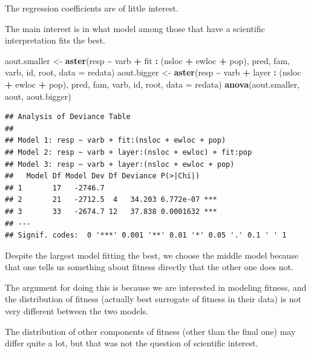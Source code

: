 \documentclass[
  ignorenonframetext,
]{beamer}
\newenvironment{Shaded}{\begin{snugshade}}{\end{snugshade}}
\newcommand{\AttributeTok}[1]{\textcolor[rgb]{0.13,0.29,0.53}{#1}}
\newcommand{\FunctionTok}[1]{\textcolor[rgb]{0.13,0.29,0.53}{\textbf{#1}}}
\newcommand{\NormalTok}[1]{#1}
\newcommand{\OtherTok}[1]{\textcolor[rgb]{0.56,0.35,0.01}{#1}}
\newcommand{\SpecialCharTok}[1]{\textcolor[rgb]{0.81,0.36,0.00}{\textbf{#1}}}
\begin{document}
\begin{frame}[fragile]{}
\protect\hypertarget{section-20}{}
The regression coefficients are of little interest.

The main interest is in what model among those that have a scientific
interpretation fits the best.

\vspace{12pt}
\tiny

\begin{Shaded}
\begin{Highlighting}[]
\NormalTok{aout.smaller }\OtherTok{\textless{}{-}} \FunctionTok{aster}\NormalTok{(resp }\SpecialCharTok{\textasciitilde{}}\NormalTok{ varb }\SpecialCharTok{+} 
\NormalTok{  fit }\SpecialCharTok{:}\NormalTok{ (nsloc }\SpecialCharTok{+}\NormalTok{ ewloc }\SpecialCharTok{+}\NormalTok{ pop), }
\NormalTok{  pred, fam, varb, id, root, }\AttributeTok{data =}\NormalTok{ redata)}
\NormalTok{aout.bigger }\OtherTok{\textless{}{-}} \FunctionTok{aster}\NormalTok{(resp }\SpecialCharTok{\textasciitilde{}}\NormalTok{ varb }\SpecialCharTok{+} 
\NormalTok{  layer }\SpecialCharTok{:}\NormalTok{ (nsloc }\SpecialCharTok{+}\NormalTok{ ewloc }\SpecialCharTok{+}\NormalTok{ pop), }
\NormalTok{  pred, fam, varb, id, root, }\AttributeTok{data =}\NormalTok{ redata)}
\FunctionTok{anova}\NormalTok{(aout.smaller, aout, aout.bigger)}
\end{Highlighting}
\end{Shaded}

\begin{verbatim}
## Analysis of Deviance Table
## 
## Model 1: resp ~ varb + fit:(nsloc + ewloc + pop)
## Model 2: resp ~ varb + layer:(nsloc + ewloc) + fit:pop
## Model 3: resp ~ varb + layer:(nsloc + ewloc + pop)
##   Model Df Model Dev Df Deviance P(>|Chi|)    
## 1       17   -2746.7                          
## 2       21   -2712.5  4   34.203 6.772e-07 ***
## 3       33   -2674.7 12   37.838 0.0001632 ***
## ---
## Signif. codes:  0 '***' 0.001 '**' 0.01 '*' 0.05 '.' 0.1 ' ' 1
\end{verbatim}
\end{frame}

\begin{frame}{}
\protect\hypertarget{section-21}{}
Despite the largest model fitting the best, we choose the middle model
because that one tells us something about fitness directly that the
other one does not.

The argument for doing this is because we are interested in modeling
fitness, and the distribution of fitness (actually best surrogate of
fitness in their data) is not very different between the two models.

The distribution of other components of fitness (other than the final
one) may differ quite a lot, but that was not the question of scientific
interest.
\end{frame}
\end{document}
